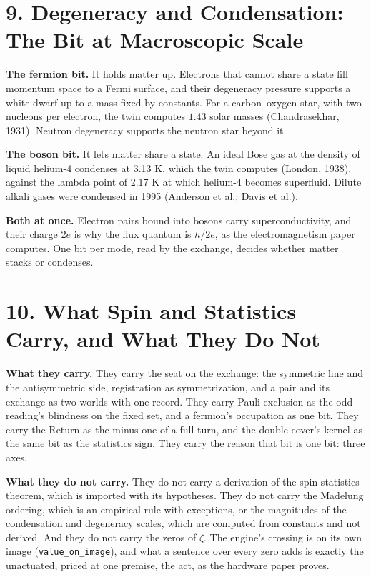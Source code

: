 \documentclass[10pt]{article}
\begin{document}
\hypertarget{degeneracy-and-condensation-the-bit-at-macroscopic-scale}{%
\section{9. Degeneracy and Condensation: The Bit at Macroscopic
Scale}\label{degeneracy-and-condensation-the-bit-at-macroscopic-scale}}

\textbf{The fermion bit.} It holds matter up. Electrons that cannot
share a state fill momentum space to a Fermi surface, and their
degeneracy pressure supports a white dwarf up to a mass fixed by
constants. For a carbon--oxygen star, with two nucleons per electron,
the twin computes \(1.43\) solar masses (Chandrasekhar, 1931). Neutron
degeneracy supports the neutron star beyond it.

\textbf{The boson bit.} It lets matter share a state. An ideal Bose gas
at the density of liquid helium-4 condenses at 3.13 K, which the twin
computes (London, 1938), against the lambda point of 2.17 K at which
helium-4 becomes superfluid. Dilute alkali gases were condensed in 1995
(Anderson et al.; Davis et al.).

\textbf{Both at once.} Electron pairs bound into bosons carry
superconductivity, and their charge \(2e\) is why the flux quantum is
\(h/2e\), as the electromagnetism paper computes. One bit per mode, read
by the exchange, decides whether matter stacks or condenses.

\hypertarget{what-spin-and-statistics-carry-and-what-they-do-not}{%
\section{10. What Spin and Statistics Carry, and What They Do
Not}\label{what-spin-and-statistics-carry-and-what-they-do-not}}

\textbf{What they carry.} They carry the seat on the exchange: the
symmetric line and the antisymmetric side, registration as
symmetrization, and a pair and its exchange as two worlds with one
record. They carry Pauli exclusion as the odd reading's blindness on the
fixed set, and a fermion's occupation as one bit. They carry the Return
as the minus one of a full turn, and the double cover's kernel as the
same bit as the statistics sign. They carry the reason that bit is one
bit: three axes.

\textbf{What they do not carry.} They do not carry a derivation of the
spin-statistics theorem, which is imported with its hypotheses. They do
not carry the Madelung ordering, which is an empirical rule with
exceptions, or the magnitudes of the condensation and degeneracy scales,
which are computed from constants and not derived. And they do not carry
the zeros of \(\zeta\). The engine's crossing is on its own image
(\texttt{value\_on\_image}), and what a sentence over every zero adds is
exactly the unactuated, priced at one premise, the act, as the hardware
paper proves.
\end{document}
